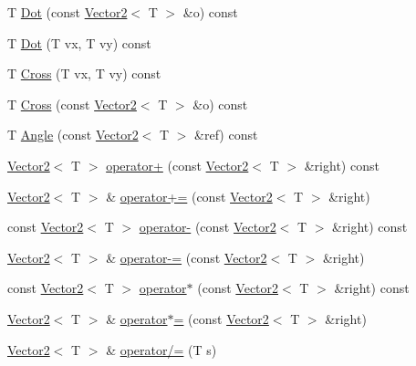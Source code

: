 \begin{DoxyCompactItemize}
\item 
T \hyperlink{classastu_1_1Vector2_a44f449c9f23b8e5aa2739c3a50b57ceb}{Dot} (const \hyperlink{classastu_1_1Vector2}{Vector2}$<$ T $>$ \&o) const
\item 
T \hyperlink{classastu_1_1Vector2_a0fb863e03982e1583a0945873caf92d7}{Dot} (T vx, T vy) const
\item 
T \hyperlink{classastu_1_1Vector2_ad7245590bd3a503f0c388cad9008789b}{Cross} (T vx, T vy) const
\item 
T \hyperlink{classastu_1_1Vector2_ab39f342813a6f5f21a533a4345e1336c}{Cross} (const \hyperlink{classastu_1_1Vector2}{Vector2}$<$ T $>$ \&o) const
\item 
T \hyperlink{classastu_1_1Vector2_af44c9648648cb03637f520669e9a2d8e}{Angle} (const \hyperlink{classastu_1_1Vector2}{Vector2}$<$ T $>$ \&ref) const
\item 
\hyperlink{classastu_1_1Vector2}{Vector2}$<$ T $>$ \hyperlink{classastu_1_1Vector2_a1ebf3c3f9ef6c8e07f6ea2327a630fca}{operator+} (const \hyperlink{classastu_1_1Vector2}{Vector2}$<$ T $>$ \&right) const
\item 
\hyperlink{classastu_1_1Vector2}{Vector2}$<$ T $>$ \& \hyperlink{classastu_1_1Vector2_a285af566f7b2e4a218932094ab9a70f8}{operator+=} (const \hyperlink{classastu_1_1Vector2}{Vector2}$<$ T $>$ \&right)
\item 
const \hyperlink{classastu_1_1Vector2}{Vector2}$<$ T $>$ \hyperlink{classastu_1_1Vector2_a694ff874fcdb2118ed665a7cb28978e9}{operator-\/} (const \hyperlink{classastu_1_1Vector2}{Vector2}$<$ T $>$ \&right) const
\item 
\hyperlink{classastu_1_1Vector2}{Vector2}$<$ T $>$ \& \hyperlink{classastu_1_1Vector2_a7022d1b830ee06d272a05d7d52c93a53}{operator-\/=} (const \hyperlink{classastu_1_1Vector2}{Vector2}$<$ T $>$ \&right)
\item 
const \hyperlink{classastu_1_1Vector2}{Vector2}$<$ T $>$ \hyperlink{classastu_1_1Vector2_a5ee8479488e6da2a82110f2ac62d386f}{operator$\ast$} (const \hyperlink{classastu_1_1Vector2}{Vector2}$<$ T $>$ \&right) const
\item 
\hyperlink{classastu_1_1Vector2}{Vector2}$<$ T $>$ \& \hyperlink{classastu_1_1Vector2_a3416fb656aef7113d0261533f5a8a4aa}{operator$\ast$=} (const \hyperlink{classastu_1_1Vector2}{Vector2}$<$ T $>$ \&right)
\item 
\hyperlink{classastu_1_1Vector2}{Vector2}$<$ T $>$ \& \hyperlink{classastu_1_1Vector2_a9f9362218a0d011032324cbc7a9a85a1}{operator/=} (T s)
\item 

\end{DoxyCompactItemize}
